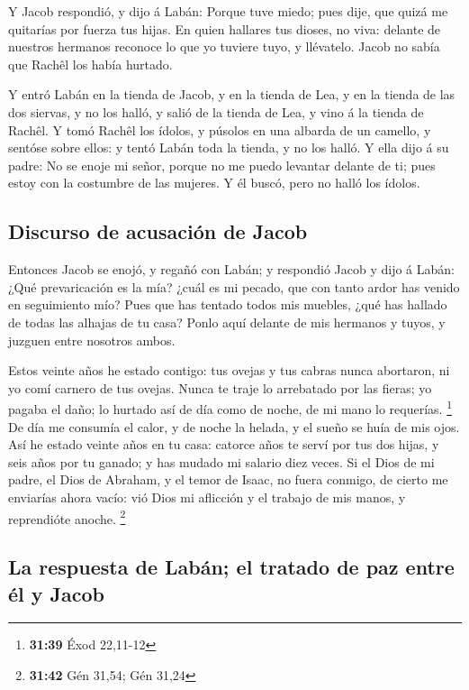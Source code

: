  Y Jacob respondió, y dijo á Labán: Porque tuve miedo;
pues dije, que quizá me quitarías por fuerza tus hijas. 
En quien hallares tus dioses, no viva: delante de nuestros hermanos
reconoce lo que yo tuviere tuyo, y llévatelo. Jacob no sabía que Rachêl
los había hurtado.

 Y entró Labán en la tienda de Jacob, y en la tienda de
Lea, y en la tienda de las dos siervas, y no los halló, y salió de la
tienda de Lea, y vino á la tienda de Rachêl.  Y tomó
Rachêl los ídolos, y púsolos en una albarda de un camello, y sentóse
sobre ellos: y tentó Labán toda la tienda, y no los halló.
 Y ella dijo á su padre: No se enoje mi señor, porque no
me puedo levantar delante de ti; pues estoy con la costumbre de las
mujeres. Y él buscó, pero no halló los ídolos.

\hypertarget{discurso-de-acusaciuxf3n-de-jacob}{%
\subsection{Discurso de acusación de
Jacob}\label{discurso-de-acusaciuxf3n-de-jacob}}

 Entonces Jacob se enojó, y regañó con Labán; y respondió
Jacob y dijo á Labán: ¿Qué prevaricación es la mía? ¿cuál es mi pecado,
que con tanto ardor has venido en seguimiento mío?  Pues
que has tentado todos mis muebles, ¿qué has hallado de todas las alhajas
de tu casa? Ponlo aquí delante de mis hermanos y tuyos, y juzguen entre
nosotros ambos.

 Estos veinte años he estado contigo: tus ovejas y tus
cabras nunca abortaron, ni yo comí carnero de tus ovejas.
 Nunca te traje lo arrebatado por las fieras; yo pagaba
el daño; lo hurtado así de día como de noche, de mi mano lo requerías.
\footnote{\textbf{31:39} Éxod 22,11-12}  De día me
consumía el calor, y de noche la helada, y el sueño se huía de mis ojos.
 Así he estado veinte años en tu casa: catorce años te
serví por tus dos hijas, y seis años por tu ganado; y has mudado mi
salario diez veces.  Si el Dios de mi padre, el Dios de
Abraham, y el temor de Isaac, no fuera conmigo, de cierto me enviarías
ahora vacío: vió Dios mi aflicción y el trabajo de mis manos, y
reprendióte anoche. \footnote{\textbf{31:42} Gén 31,54; Gén 31,24}

\hypertarget{la-respuesta-de-labuxe1n-el-tratado-de-paz-entre-uxe9l-y-jacob}{%
\subsection{La respuesta de Labán; el tratado de paz entre él y
Jacob}\label{la-respuesta-de-labuxe1n-el-tratado-de-paz-entre-uxe9l-y-jacob}}

